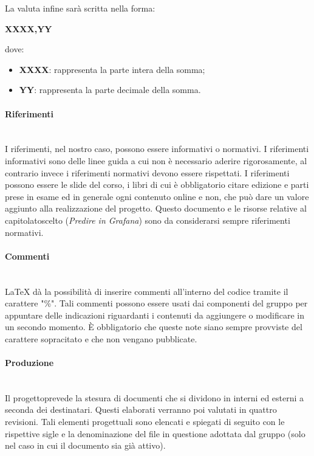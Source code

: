                 La valuta infine sarà scritta nella forma: \newline \newline
                \centerline{\textbf{XXXX,YY}} \newline \newline
                dove:
                \begin{itemize}
                    \item \textbf{XXXX}: rappresenta la parte intera della somma;
                    \item \textbf{YY}: rappresenta la parte decimale della somma.
                \end{itemize}
            \paragraph*{Riferimenti}\mbox{}\\ [1mm]
                I riferimenti, nel nostro caso, possono essere informativi o normativi. I riferimenti informativi sono delle linee guida a cui non è necessario aderire rigorosamente, al contrario invece i riferimenti normativi devono essere rispettati. I riferimenti possono essere le slide del corso, i libri di cui è obbligatorio citare edizione e parti prese in esame ed in generale ogni contenuto online e non, che può dare un valore aggiunto alla realizzazione del progetto\glo. Questo documento e le risorse relative al capitolato\glosp scelto (\textit{Predire in Grafana}) sono da considerarsi sempre riferimenti normativi.
            \paragraph*{Commenti}\mbox{}\\ [1mm]
                \LaTeX\xspace dà la possibilità di inserire commenti all'interno del codice tramite il carattere "\%". Tali commenti possono essere usati dai componenti del gruppo per appuntare delle indicazioni riguardanti i contenuti da aggiungere o modificare in un secondo momento. È obbligatorio che queste note siano sempre provviste del carattere sopracitato e che non vengano pubblicate.
        \paragraph{Produzione}\mbox{}\\ [1mm]
            Il progetto\glosp prevede la stesura di documenti che si dividono in interni ed esterni a seconda dei destinatari. Questi elaborati verranno poi valutati in quattro revisioni. Tali elementi progettuali sono elencati e spiegati di seguito con le rispettive sigle e la denominazione del file in questione adottata dal gruppo (solo nel caso in cui il documento sia già attivo).
